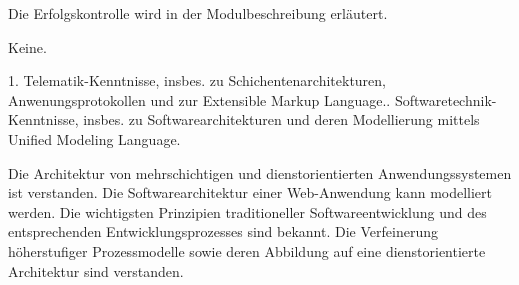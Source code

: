 \begin{course}

\setdoclanguagegerman
{}



\coursehead


\label{cour_5663.dp_997}


\begin{styleenv}
\begin{assessment}
Die Erfolgskontrolle wird in der Modulbeschreibung erläutert.


\end{assessment}

\begin{conditions}Keine.\end{conditions}

\begin{recommendations}1. Telematik-Kenntnisse, insbes. zu Schichentenarchitekturen, Anwenungsprotokollen und zur\newline
 Extensible Markup Language.. Softwaretechnik-Kenntnisse, insbes. zu Softwarearchitekturen und deren Modellierung mittels Unified Modeling Language.

\end{recommendations}
\end{styleenv}

\begin{learningoutcomes}
Die Architektur von mehrschichtigen und dienstorientierten Anwendungssystemen ist verstanden.\newline
 Die Softwarearchitektur einer Web-Anwendung kann modelliert werden.\newline
 Die wichtigsten Prinzipien traditioneller Softwareentwicklung und des entsprechenden Entwicklungsprozesses sind bekannt.\newline
Die Verfeinerung höherstufiger Prozessmodelle sowie deren Abbildung auf eine dienstorientierte Architektur sind verstanden.



\end{learningoutcomes}
\end{course}
